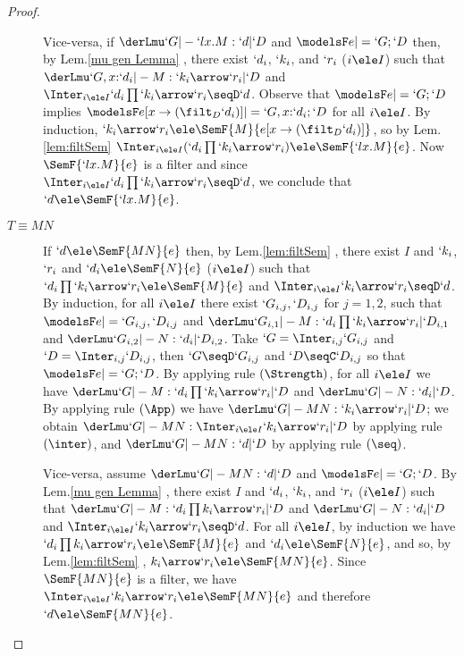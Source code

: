 \documentclass{CSML}
\begin{document}
\begin{proof}
\begin{description}
Vice-versa, if $ \derLmu `G |- `lx.M : `d | `D $ and $ \modelsF e |= `G;`D $ then, by Lem.\skp\ref{mu gen Lemma}%
, there exist %
$`d_i$, $`k_i$, and $`r_i$ ($i \ele I$) such that $ \derLmu `G,x{:}`d_i |- M : `k_i\arrow `r_i | `D $ and $\Inter_{i \ele I} `d_i\prod `k_i\arrow `r_i \seqD `d$.
Observe that $\modelsF e |= `G;`D $ implies $\modelsF e[x\to (\filt_D `d_i)] |= `G, x{:}`d_i;`D $ for all $i \ele I$.
By induction, $`k_i\arrow `r_i \ele \SemF { M }{ e[x\to (\filt_D `d_i)] }$, so by Lem.\skp\ref{lem:filtSem} %
 $\Inter_{i \ele I}(`d_i\prod `k_i\arrow `r_i) \ele \SemF { `l x.M}{ e } $. 
Now $\SemF { `l x.M}{ e }$ is a filter and since $\Inter_{i \ele I} `d_i\prod `k_i\arrow `r_i \seqD `d$, we conclude that $`d \ele \SemF { `l x.M}{ e }$. 

 \item [$ T\equiv MN $] 
If $`d \ele \SemF { MN}{ e }$ then, by Lem.\skp\ref{lem:filtSem}%
, there exist $I$ and $`k_i$, $`r_i$ and $`d_i \ele \SemF { N }{ e }$ ($i \ele I$) such that $`d_i\prod `k_i\arrow `r_i \ele \SemF { M }{ e }$ and $\Inter_{i \ele I}`k_i\arrow `r_i\seqD `d$. 
By induction, for all $i \ele I$ there exist $`G_{i,j},`D _{i,j}$ for $j=1,2$, such that $\modelsF e |= `G_{i,j},`D _{i,j} $ and $ \derLmu `G_{i,1} |- M : `d_i\prod `k_i\arrow `r_i | `D_{i,1} $ and $ \derLmu `G_{i,2} |- N : `d_i | `D_{i,2} $. 
Take $`G = \Inter_{i,j}`G_{i,j}$ and $`D = \Inter_{i,j}`D_{i,j}$, then $`G\seqD `G_{i,j}$ and $`D\seqC `D_{i,j}$ so that $\modelsF e |= `G;`D $.
By applying rule $(\Strength)$, for all $i \ele I$ we have $ \derLmu `G |- M : `d_i\prod `k_i\arrow `r_i | `D $ and $ \derLmu `G |- N : `d_i | `D $.
By applying rule $(\App)$ we have $ \derLmu `G |- MN : `k_i\arrow `r_i | `D $; we obtain $ \derLmu `G |- MN : \Inter_{i \ele I}`k_i\arrow `r_i | `D $ by applying rule $(\inter)$, and $ \derLmu `G |- MN : `d | `D $ by applying rule $(\seq)$.
	
Vice-versa, assume $ \derLmu `G |- MN : `d | `D $ and $\modelsF e |= `G;`D $. 
By Lem.\skp\ref{mu gen Lemma}%
, there exist $I$ and $`d_i$, $`k_i$, and $`r_i$ ($i \ele I$) such that $ \derLmu `G |- M : `d_i\prod k_i\arrow `r_i | `D $ and $ \derLmu `G |- N : `d_i | `D $ and $\Inter_{i \ele I}`k_i\arrow `r_i \seqD `d$.
For all $i \ele I$, by induction we have $`d_i\prod k_i\arrow `r_i \ele \SemF { M }{ e }$ and $`d_i \ele \SemF { N }{ e }$, and so, by Lem.\skp\ref{lem:filtSem}%
, $k_i\arrow `r_i \ele \SemF { MN }{ e }$. 
Since $\SemF { MN }{ e }$ is a filter, we have $\Inter_{i \ele I}`k_i\arrow `r_i \ele \SemF { MN }{ e }$ and therefore $`d \ele \SemF { MN }{ e }$.



\end{description}
\end{proof}
\end{document}
